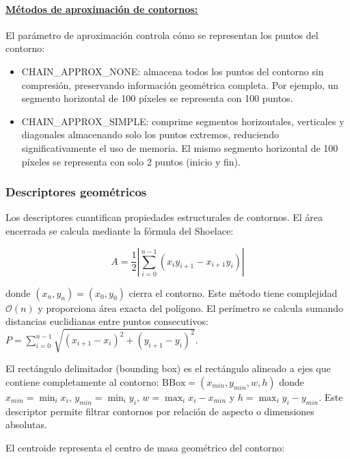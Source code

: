 \paragraph{\underline{Métodos de aproximación de contornos:}}

El parámetro de aproximación controla cómo se representan los puntos del contorno:

\begin{itemize}[label=$\bullet$]
\item CHAIN\_APPROX\_NONE: almacena todos los puntos del contorno sin compresión, preservando información geométrica completa. Por ejemplo, un segmento horizontal de 100 píxeles se representa con 100 puntos.

\item CHAIN\_APPROX\_SIMPLE: comprime segmentos horizontales, verticales y diagonales almacenando solo los puntos extremos, reduciendo significativamente el uso de memoria. El mismo segmento horizontal de 100 píxeles se representa con solo 2 puntos (inicio y fin).
\end{itemize}

\subsubsection{Descriptores geométricos}

Los descriptores cuantifican propiedades estructurales de contornos. El área encerrada se calcula mediante la fórmula del Shoelace:

\begin{equation}
A = \frac{1}{2}\left|\sum_{i=0}^{n-1}(x_i y_{i+1} - x_{i+1}y_i)\right|
\end{equation}

donde $(x_n, y_n) = (x_0, y_0)$ cierra el contorno. Este método tiene complejidad $\mathcal{O}(n)$ y proporciona área exacta del polígono. El perímetro se calcula sumando distancias euclidianas entre puntos consecutivos: $P = \sum_{i=0}^{n-1}\sqrt{(x_{i+1}-x_i)^2 + (y_{i+1}-y_i)^2}$.

El rectángulo delimitador (bounding box) es el rectángulo alineado a ejes que contiene completamente al contorno: $\text{BBox} = (x_{min}, y_{min}, w, h)$ donde $x_{min} = \min_i x_i$, $y_{min} = \min_i y_i$, $w = \max_i x_i - x_{min}$ y $h = \max_i y_i - y_{min}$. Este descriptor permite filtrar contornos por relación de aspecto o dimensiones absolutas.

El centroide representa el centro de masa geométrico del contorno:

